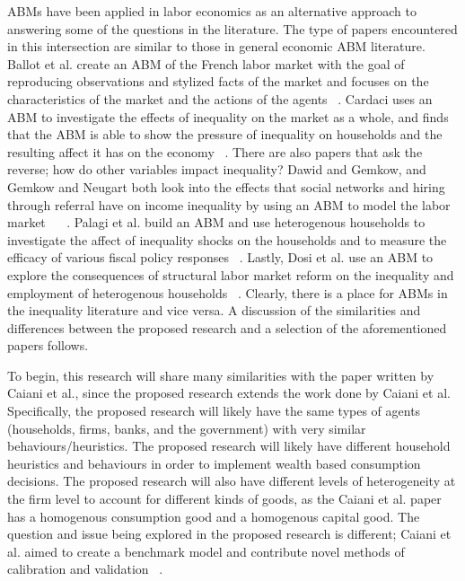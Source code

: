 \documentclass[11pt]{article}
\begin{document}
ABMs have been applied in labor economics as an alternative approach to answering
some of the questions in the literature. The type of papers encountered in this
intersection are similar to those in general economic ABM literature. Ballot et al.
create an ABM of the French labor market with the goal of reproducing observations
and stylized facts of the market and focuses on the characteristics of the market
and the actions of the agents ~\cite{Ballot-french-paper}. Cardaci uses an ABM
to investigate the effects of inequality on the market as a whole, and finds
that the ABM is able to show the pressure of inequality on households and the
resulting affect it has on the economy ~\cite{Cardaci-housing-paper}. There are
also papers that ask the reverse; how do other variables impact inequality?
Dawid and Gemkow, and Gemkow and Neugart both look into the effects that social
networks and hiring through referral have on income inequality by using an ABM
to model the labor market ~\cite{Dawid-network-paper} ~\cite{Gemkow-network-paper}.
Palagi et al. build an ABM and use heterogenous households to investigate the
affect of inequality shocks on the households and to measure the efficacy of
various fiscal policy responses ~\cite{Palagi-redistributive-paper}. Lastly,
Dosi et al. use an ABM to explore the consequences of structural labor market
reform on the inequality and employment of heterogenous households ~\cite{Dosi-reform-paper}.
Clearly, there is a place for ABMs in the inequality literature and vice versa.
A discussion of the similarities and differences between the proposed research
and a selection of the aforementioned papers follows.

To begin, this research will share many similarities with the paper written by
Caiani et al., since the proposed research extends the work done by Caiani et al.
Specifically, the proposed research will likely have the same types of agents
(households, firms, banks, and the government) with very similar behaviours/heuristics.
 The proposed research will likely have different household heuristics and
 behaviours in order to implement wealth based consumption decisions. The
 proposed research will also have different levels of heterogeneity at the firm
 level to account for different kinds of goods, as the Caiani et al. paper has a
 homogenous consumption good and a homogenous capital good. The question and
 issue being explored in the proposed research is different; Caiani et al. aimed
 to create a benchmark model and contribute novel methods of calibration and
 validation ~\cite{Caiani-benchmark-paper}.
\end{document}
